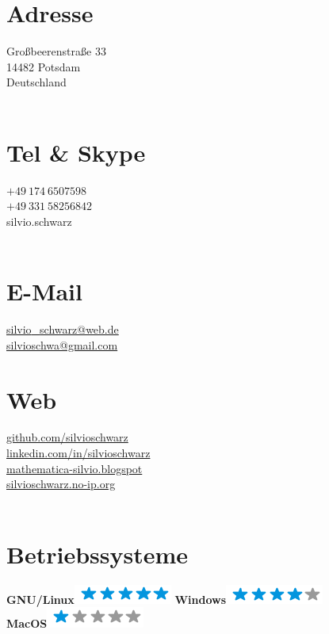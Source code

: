 \documentclass{scrartcl}
\begin{document}
\begin{figure}[htb]
\begin{minipage}[t]{0.25\textwidth}
	\flushright
	\section*{\hfill \color{pblue} Adresse}
	\vspace{-4mm}
	Großbeerenstraße 33\\
	14482 Potsdam\\
	Deutschland\\
	~
	\section*{\hfill \color{pblue} Tel \& Skype}
	\vspace{-4mm}
	$+49~174~6507598$\\
	$+49~331~58256842$\\
	silvio.schwarz\\
	~
	\section*{\hfill \color{pblue} E-Mail}
	\vspace{-4mm}
	\href{mailto:silvio\_ schwarz@web.de}{silvio{\_}schwarz@web.de}\\
	\href{mailto:silvioschwa@gmail.com}{silvioschwa@gmail.com}
	~
	\section*{\hfill \color{pblue} Web}
	\vspace{-4mm}
	\href{https://www.github.com/silvioschwarz}{github.com/silvioschwarz} \\
	\href{https://www.linkedin.com/in/silvioschwarz}{linkedin.com/in/silvioschwarz} \\
	\href{http://www.mathematica-silvio.blogspot.de/}{mathematica-silvio.blogspot}\\
	\href{https://www.silvioschwarz.no-ip.org}{silvioschwarz.no-ip.org}\\
~
	\section*{\hfill \color{pblue} Betriebssysteme}
	\vspace{-2mm}
	\textbf{GNU/Linux}\includegraphics[scale=0.40]{img/5stars.png}
	\textbf{Windows}\includegraphics[scale=0.40]{img/4stars.png}
    \textbf{MacOS}\includegraphics[scale=0.40]{img/1stars.png}\\
~

\end{minipage}
\end{figure}
\end{document}
